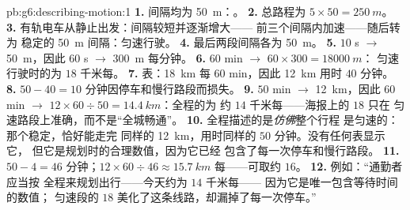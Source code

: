 \begin{solution}{pb:g6:describing-motion:1}
\textbf{1.} 间隔均为 \qty{50}{m}：。
\textbf{2.} 总路程为 $5 \times 50 = \qty{250}{m}$。
\textbf{3.} 有轨电车从静止出发：间隔较短并逐渐增大——
前三个间隔内加速——随后转为
稳定的 \qty{50}{m} 间隔：匀速行驶。
\textbf{4.} 最后两段间隔各为 \qty{50}{m}。
\textbf{5.} $10$ s $\to$ \qty{50}{m}，因此 $60$ s $\to$
\qty{300}{m} 每分钟。
\textbf{6.} $60$ min $\to$ $60 \times 300 = \qty{18000}{m}$：
匀速行驶时的为 $18$ 千米每。
\textbf{7.} 表：\qty{18}{km} 每 $60$ min，因此 \qty{12}{km} 用时
$40$ 分钟。
\textbf{8.} $50 - 40 = 10$ 分钟因停车和慢行路段而损失。
\textbf{9.} $50$ min $\to$ \qty{12}{km}，因此 $60$ min $\to$
$12 \times 60 \div 50 = \qty{14.4}{km}$：全程的为
约 $14$ 千米每——海报上的 $18$ 只在
匀速路段上准确，而不是“全城畅通”。
\textbf{10.} 全程描述的是\emph{仿佛}整个行程
是匀速的：那个稳定，恰好能走完
同样的 \qty{12}{km}，用时同样的 $50$ 分钟。没有任何表显示它，
但它是规划时的合理数值，因为它已经
包含了每一次停车和慢行路段。
\textbf{11.} $50 - 4 = 46$ 分钟；$12 \times 60 \div 46 \approx
\qty{15.7}{km}$ 每——可取约 $16$。
\textbf{12.} 例如：“通勤者应当按
全程来规划出行——今天约为 $14$ 千米每——
因为它是唯一包含等待时间的数值；
匀速段的 $18$ 美化了这条线路，却漏掉了每一次停车。”
\end{solution}
